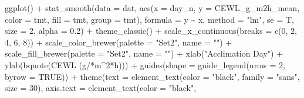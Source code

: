 \documentclass[
]{article}
\newenvironment{Shaded}{\begin{snugshade}}{\end{snugshade}}
\newcommand{\AttributeTok}[1]{\textcolor[rgb]{0.77,0.63,0.00}{#1}}
\newcommand{\ConstantTok}[1]{\textcolor[rgb]{0.00,0.00,0.00}{#1}}
\newcommand{\DecValTok}[1]{\textcolor[rgb]{0.00,0.00,0.81}{#1}}
\newcommand{\FloatTok}[1]{\textcolor[rgb]{0.00,0.00,0.81}{#1}}
\newcommand{\FunctionTok}[1]{\textcolor[rgb]{0.00,0.00,0.00}{#1}}
\newcommand{\NormalTok}[1]{#1}
\newcommand{\SpecialCharTok}[1]{\textcolor[rgb]{0.00,0.00,0.00}{#1}}
\newcommand{\StringTok}[1]{\textcolor[rgb]{0.31,0.60,0.02}{#1}}
\begin{document}
\begin{Shaded}
\begin{Highlighting}[]
\FunctionTok{ggplot}\NormalTok{() }\SpecialCharTok{+} 
  \FunctionTok{stat\_smooth}\NormalTok{(}\AttributeTok{data =}\NormalTok{ dat,}
              \FunctionTok{aes}\NormalTok{(}\AttributeTok{x =}\NormalTok{ day\_n,}
                  \AttributeTok{y =}\NormalTok{ CEWL\_g\_m2h\_mean, }
                  \AttributeTok{color =}\NormalTok{ tmt,}
                  \AttributeTok{fill =}\NormalTok{ tmt,}
                  \AttributeTok{group =}\NormalTok{ tmt),}
              \AttributeTok{formula =}\NormalTok{ y }\SpecialCharTok{\textasciitilde{}}\NormalTok{ x, }
              \AttributeTok{method =} \StringTok{"lm"}\NormalTok{, }
              \AttributeTok{se =}\NormalTok{ T, }
              \AttributeTok{size =} \DecValTok{2}\NormalTok{, }
              \AttributeTok{alpha =} \FloatTok{0.2}\NormalTok{) }\SpecialCharTok{+} 
  \FunctionTok{theme\_classic}\NormalTok{() }\SpecialCharTok{+} 
  \FunctionTok{scale\_x\_continuous}\NormalTok{(}\AttributeTok{breaks =} \FunctionTok{c}\NormalTok{(}\DecValTok{0}\NormalTok{, }\DecValTok{2}\NormalTok{, }\DecValTok{4}\NormalTok{, }\DecValTok{6}\NormalTok{, }\DecValTok{8}\NormalTok{)) }\SpecialCharTok{+}
  \FunctionTok{scale\_color\_brewer}\NormalTok{(}\AttributeTok{palette =} \StringTok{"Set2"}\NormalTok{, }\AttributeTok{name =} \StringTok{""}\NormalTok{) }\SpecialCharTok{+}
  \FunctionTok{scale\_fill\_brewer}\NormalTok{(}\AttributeTok{palette =} \StringTok{"Set2"}\NormalTok{, }\AttributeTok{name =} \StringTok{""}\NormalTok{) }\SpecialCharTok{+}
  \FunctionTok{xlab}\NormalTok{(}\StringTok{"Acclimation Day"}\NormalTok{) }\SpecialCharTok{+} 
  \FunctionTok{ylab}\NormalTok{(}\FunctionTok{bquote}\NormalTok{(}\StringTok{\textquotesingle{}CEWL (g/\textquotesingle{}}\SpecialCharTok{*}\NormalTok{m}\SpecialCharTok{\^{}}\DecValTok{2}\SpecialCharTok{*}\StringTok{\textquotesingle{}h)\textquotesingle{}}\NormalTok{)) }\SpecialCharTok{+} 
  \FunctionTok{guides}\NormalTok{(}\AttributeTok{shape =} \FunctionTok{guide\_legend}\NormalTok{(}\AttributeTok{nrow =} \DecValTok{2}\NormalTok{, }\AttributeTok{byrow =} \ConstantTok{TRUE}\NormalTok{)) }\SpecialCharTok{+}
  \FunctionTok{theme}\NormalTok{(}\AttributeTok{text =} \FunctionTok{element\_text}\NormalTok{(}\AttributeTok{color =} \StringTok{"black"}\NormalTok{, }
                            \AttributeTok{family =} \StringTok{"sans"}\NormalTok{, }
                            \AttributeTok{size =} \DecValTok{30}\NormalTok{),}
        \AttributeTok{axis.text =} \FunctionTok{element\_text}\NormalTok{(}\AttributeTok{color =} \StringTok{"black"}\NormalTok{, }

\end{Highlighting}
\end{Shaded}
\end{document}
